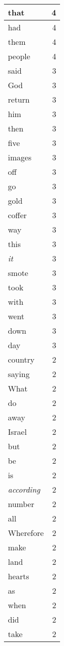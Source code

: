 \begin{center}
\begin{longtable}{l|r}
that & 4 \\ \hline
had & 4 \\ \hline
them & 4 \\ \hline
people & 4 \\ \hline
said & 3 \\ \hline
God & 3 \\ \hline
return & 3 \\ \hline
him & 3 \\ \hline
then & 3 \\ \hline
five & 3 \\ \hline
images & 3 \\ \hline
off & 3 \\ \hline
go & 3 \\ \hline
gold & 3 \\ \hline
coffer & 3 \\ \hline
way & 3 \\ \hline
this & 3 \\ \hline
\emph{it} & 3 \\ \hline
smote & 3 \\ \hline
took & 3 \\ \hline
with & 3 \\ \hline
went & 3 \\ \hline
down & 3 \\ \hline
day & 3 \\ \hline
country & 2 \\ \hline
saying & 2 \\ \hline
What & 2 \\ \hline
do & 2 \\ \hline
away & 2 \\ \hline
Israel & 2 \\ \hline
but & 2 \\ \hline
be & 2 \\ \hline
is & 2 \\ \hline
\emph{according} & 2 \\ \hline
number & 2 \\ \hline
all & 2 \\ \hline
Wherefore & 2 \\ \hline
make & 2 \\ \hline
land & 2 \\ \hline
hearts & 2 \\ \hline
as & 2 \\ \hline
when & 2 \\ \hline
did & 2 \\ \hline
take & 2 \\ \hline

\end{longtable}
\end{center}
